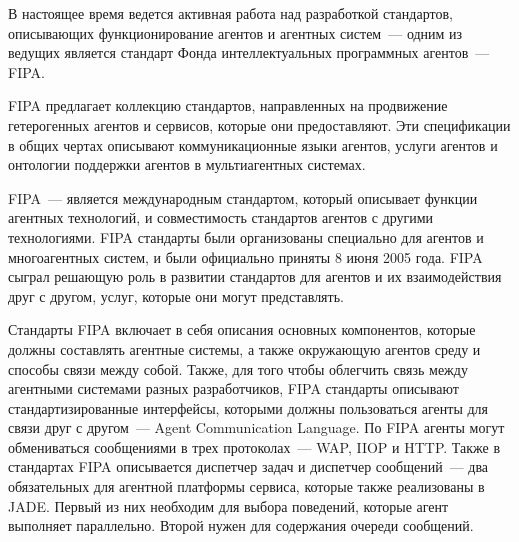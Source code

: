 В настоящее время ведется активная работа над разработкой стандартов, описывающих функционирование агентов и агентных систем~--- одним из ведущих является стандарт Фонда интеллектуальных программных агентов~--- FIPA.

FIPA предлагает коллекцию стандартов, направленных на продвижение гетерогенных агентов и сервисов, которые они предоставляют. Эти спецификации в общих чертах описывают коммуникационные языки агентов, услуги агентов и онтологии поддержки агентов в мультиагентных системах.

FIPA~--- является международным стандартом, который описывает функции агентных технологий, и совместимость стандартов агентов с другими технологиями. FIPA стандарты были организованы специально для агентов и многоагентных систем, и были официально приняты 8 июня 2005 года. FIPA сыграл решающую роль в развитии стандартов для агентов и их взаимодействия друг с другом, услуг, которые они могут представлять.

Стандарты FIPA включает в себя описания основных компонентов, которые должны составлять агентные системы, а также окружающую агентов среду и способы связи между собой. Также, для того чтобы облегчить связь между агентными системами разных разработчиков, FIPA стандарты описывают стандартизированные интерфейсы, которыми должны пользоваться агенты для связи друг с другом~--- Agent Communication Language. По FIPA агенты могут обмениваться сообщениями в трех протоколах~--- WAP, IIOP и  HTTP. Также в стандартах FIPA описывается диспетчер задач и диспетчер сообщений~--- два обязательных для агентной платформы сервиса, которые также реализованы в JADE. Первый из них необходим для выбора поведений, которые агент выполняет параллельно. Второй нужен для содержания очереди сообщений.
